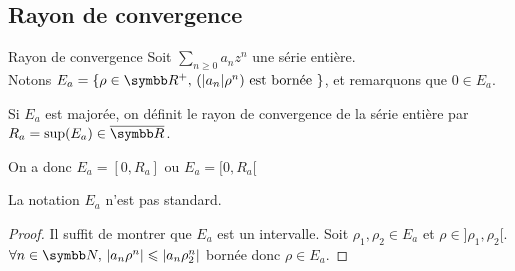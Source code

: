 \subsection{Rayon de convergence}

\begin{theoreme}{Rayon de convergence}{}
    Soit $\sum_{n \geqslant 0} a_n z^n$ une série entière. \\
    Notons $E_a = \{\rho \in \R^+, \, (|a_n|\rho^n) \text{ est bornée }\}$,
    et remarquons que $0 \in E_a$.

    \svspace Si $E_a$ est majorée, on définit le rayon de convergence de la série entière par $R_a = \sup(E_a) \in \overline{\R}$.

    On a donc $E_a = [0, R_a]$ ou $E_a = [0, R_a[$ 
\end{theoreme}

\begin{remarque}
    La notation $E_a$ n'est pas standard.
\end{remarque}

\begin{proof}
    Il suffit de montrer que $E_a$ est un intervalle. Soit $\rho_1, \rho_2 \in E_a$ et 
    $\rho \in ]\rho_1, \rho_2[$. $\forall n \in \N, \, |a_n \rho^n| \leqslant |a_n \rho_2^n|$ bornée donc $\rho \in E_a$.
\end{proof}

